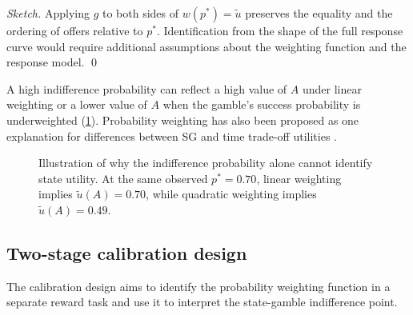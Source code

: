 \documentclass[11pt,a4paper]{article}
\begin{document}
\noindent\emph{Sketch.} Applying $g$ to both sides of $w(p^\ast)=\tilde u$ preserves the equality and the ordering of offers relative to $p^\ast$. Identification from the shape of the full response curve would require additional assumptions about the weighting function and the response model. \qed

\smallskip
A high indifference probability can reflect a high value of $A$ under linear weighting or a lower value of $A$ when the gamble's success probability is underweighted (\cref{fig:weighting}). Probability weighting has also been proposed as one explanation for differences between SG and time trade-off utilities \citep{bleichrodt2002}.

\begin{figure}[htbp]
\centering
{}
\caption{Illustration of why the indifference probability alone cannot identify state utility. At the same observed $p^\ast=0.70$, linear weighting implies $\tilde u(A)=0.70$, while quadratic weighting implies $\tilde u(A)=0.49$.}
\label{fig:weighting}
\end{figure}

\subsection{Two-stage calibration design}

The calibration design aims to identify the probability weighting function in a separate reward task and use it to interpret the state-gamble indifference point.
\end{document}
